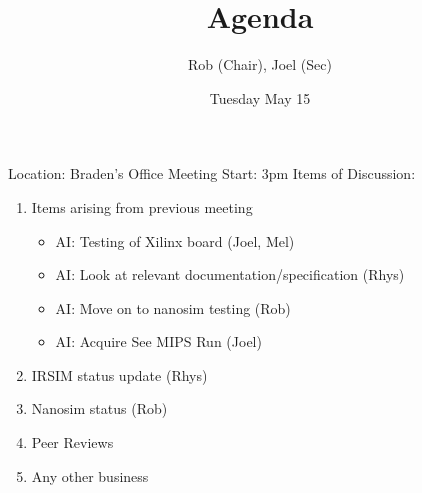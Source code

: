 \documentclass{article}
\begin{document}
  \author{Rob (Chair), Joel (Sec)}
  \title{Agenda}
  \date{Tuesday May 15}
  \maketitle
\begin{flushleft}
Location: Braden's Office 
\newline
Meeting Start: 3pm
\newline
\newline
Items of Discussion:

\begin{enumerate}

  \item Items arising from previous meeting 
    \begin{itemize}
    \item AI: Testing of Xilinx board (Joel, Mel)
    \item AI: Look at relevant documentation/specification (Rhys)
    \item AI: Move on to nanosim testing (Rob)
    \item AI: Acquire See MIPS Run (Joel)
  \end{itemize}

  \item IRSIM status update (Rhys)

  \item Nanosim status (Rob) 
  
  \item Peer Reviews 

  \item Any other business

\end{enumerate}
\end{flushleft}
\end{document}

